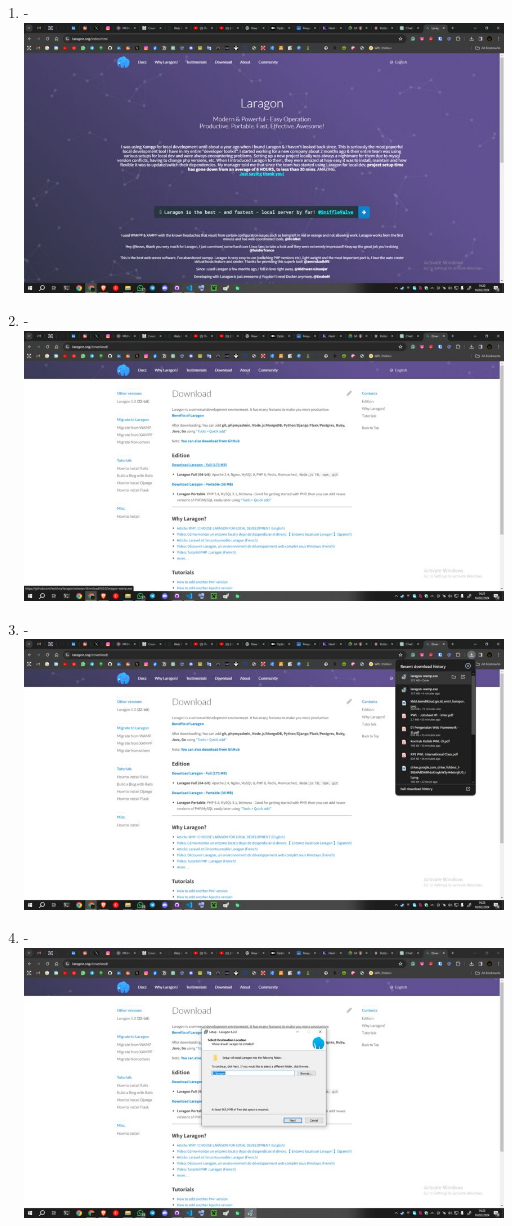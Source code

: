 \documentclass[12pt,titlepage]{article}
\begin{document}
\begin{enumerate}[label= \alph*.]
    \item - \\ \includegraphics[width=.9\textwidth]{images/figures/Laragon 1.jpg}
    \item - \\ \includegraphics[width=.9\textwidth]{images/figures/Laragon 2.jpg}
    \newpage
    \item - \\ \includegraphics[width=.9\textwidth]{images/figures/Laragon 3.jpg}
    \item - \\ \includegraphics[width=.9\textwidth]{images/figures/Laragon 4.jpg}

\end{enumerate}
\end{document}
